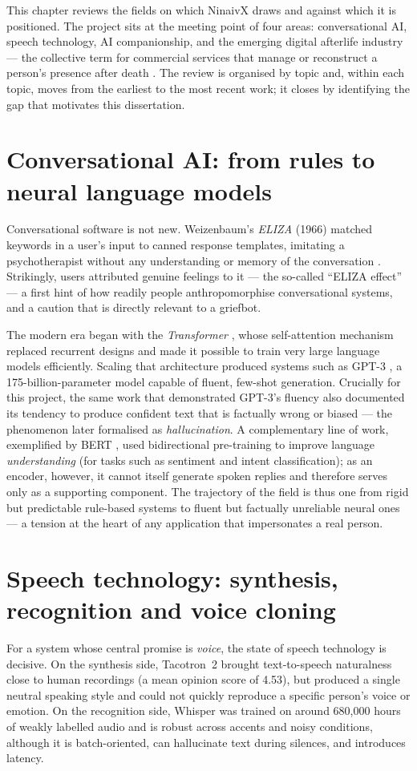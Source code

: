 \documentclass[11pt,a4paper]{report}
\begin{document}
This chapter reviews the fields on which NinaivX draws and against which it is positioned. The project sits at the meeting point of four areas: conversational AI, speech technology, AI companionship, and the emerging digital afterlife industry --- the collective term for commercial services that manage or reconstruct a person's presence after death \cite{abramson2020patent}. The review is organised by topic and, within each topic, moves from the earliest to the most recent work; it closes by identifying the gap that motivates this dissertation.

\section{Conversational AI: from rules to neural language models}
Conversational software is not new. Weizenbaum's \emph{ELIZA} (1966) matched keywords in a user's input to canned response templates, imitating a psychotherapist without any understanding or memory of the conversation \cite{weizenbaum1966eliza}. Strikingly, users attributed genuine feelings to it --- the so-called ``ELIZA effect'' --- a first hint of how readily people anthropomorphise conversational systems, and a caution that is directly relevant to a griefbot.

The modern era began with the \emph{Transformer} \cite{vaswani2017attention}, whose self-attention mechanism replaced recurrent designs and made it possible to train very large language models efficiently. Scaling that architecture produced systems such as GPT-3 \cite{brown2020language}, a 175-billion-parameter model capable of fluent, few-shot generation. Crucially for this project, the same work that demonstrated GPT-3's fluency also documented its tendency to produce confident text that is factually wrong or biased --- the phenomenon later formalised as \emph{hallucination}. A complementary line of work, exemplified by BERT \cite{devlin2019bert}, used bidirectional pre-training to improve language \emph{understanding} (for tasks such as sentiment and intent classification); as an encoder, however, it cannot itself generate spoken replies and therefore serves only as a supporting component. The trajectory of the field is thus one from rigid but predictable rule-based systems to fluent but factually unreliable neural ones --- a tension at the heart of any application that impersonates a real person.

\section{Speech technology: synthesis, recognition and voice cloning}
For a system whose central promise is \emph{voice}, the state of speech technology is decisive. On the synthesis side, Tacotron~2 \cite{shen2018tacotron} brought text-to-speech naturalness close to human recordings (a mean opinion score of 4.53), but produced a single neutral speaking style and could not quickly reproduce a specific person's voice or emotion. On the recognition side, Whisper \cite{radford2023whisper} was trained on around 680{,}000 hours of weakly labelled audio and is robust across accents and noisy conditions, although it is batch-oriented, can hallucinate text during silences, and introduces latency.
\end{document}
